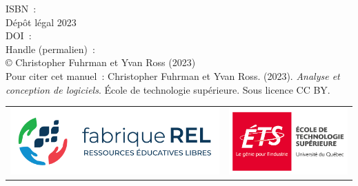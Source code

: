 

ISBN~: \\
Dépôt légal 2023 \\
DOI~: \\
Handle (permalien)~: \\
© Christopher Fuhrman et Yvan Ross (2023)\\
Pour citer cet manuel~: Christopher Fuhrman et Yvan Ross. (2023). \emph{Analyse et conception de logiciels}.
École de technologie supérieure. Sous licence CC BY.


\vfill
\begin{tabular}{m{3.5in}m{3.5in}}
\includegraphics[height=1in]{images/F-REL_logo-coul-horiz.png} &
\includegraphics[height=1in]{images/Logo_ETS_TypoGrise_D_FR_1.png}\\
\end{tabular}
